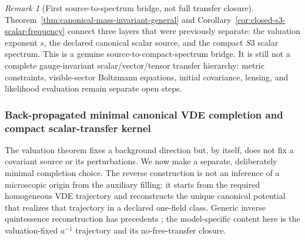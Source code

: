 \documentclass[11pt,a4paper]{article}
\def\Sthree{S3}%
\numberwithin{equation}{section}
\theoremstyle{definition}
\theoremstyle{plain}
\theoremstyle{remark}
\newtheorem{remark}[criterion]{Remark}
\newcommand{\Sthree}{S^3}
\begin{document}
\begin{remark}[First source-to-spectrum bridge, not full transfer closure]
Theorem~\ref{thm:canonical-mass-invariant-general} and Corollary~\ref{cor:closed-s3-scalar-frequency} connect three layers that were previously separate: the valuation exponent \(s\), the declared canonical scalar source, and the compact \(\Sthree\) scalar spectrum.  This is a genuine source-to-compact-spectrum bridge.  It is still not a complete gauge-invariant scalar/vector/tensor transfer hierarchy: metric constraints, visible-sector Boltzmann equations, initial covariance, lensing, and likelihood evaluation remain separate open steps.
\end{remark}



\subsubsection{Back-propagated minimal canonical VDE completion and compact scalar-transfer kernel}
\label{sec:canonical-completion}

The valuation theorem fixes a background direction but, by itself, does not fix a
covariant source or its perturbations.  We now make a separate, deliberately
minimal completion choice.  The reverse construction is not an inference of a
microscopic origin from the auxiliary filling: it starts from the required
homogeneous VDE trajectory and reconstructs the unique canonical potential that
realizes that trajectory in a declared one-field class.  Generic inverse
quintessence reconstruction has precedents \cite{SahlenLiddleParkinson2005};
the model-specific content here is the valuation-fixed $a^{-1}$ trajectory and
its no-free-transfer closure.
\end{document}
